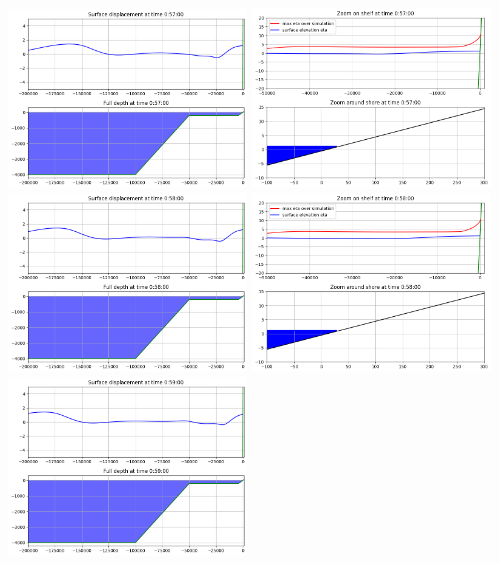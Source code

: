 \documentclass[11pt]{article}
\begin{document}
\vskip 10pt 
\includegraphics[width=0.475\textwidth]{frame0057fig0.png}
\includegraphics[width=0.475\textwidth]{frame0057fig1.png}
\vskip 10pt 
\includegraphics[width=0.475\textwidth]{frame0058fig0.png}
\includegraphics[width=0.475\textwidth]{frame0058fig1.png}
\vskip 10pt 
\includegraphics[width=0.475\textwidth]{frame0059fig0.png}
\end{document}
